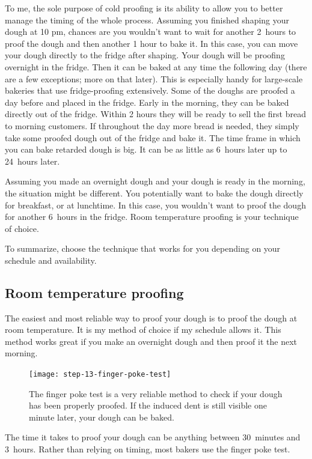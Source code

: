 To me, the sole purpose of cold proofing is its ability to allow you
to better manage the timing of the whole process. Assuming you finished shaping
your dough at 10 pm, chances are you wouldn't want to wait for another
2~hours to proof the dough and then another 1 hour to bake it. In this case,
you can move your dough directly to the fridge after shaping. Your
dough will be proofing overnight in the fridge. Then it can be baked at any time
the following day (there are a few exceptions; more on that later).
This is especially handy for large-scale bakeries that use fridge-proofing
extensively. Some of the doughs are proofed a day before and placed in the fridge.
Early in the morning, they can be baked directly out of the fridge. Within 2
hours they will be ready to sell the first bread to morning customers. If
throughout the day more bread is needed, they simply take some proofed dough out
of the fridge and bake it. The time frame in which you can bake retarded
dough is big. It can be as little as 6~hours later up to 24~hours later.

Assuming you made an overnight dough and your dough is ready in the morning,
the situation might be different. You potentially want to bake the dough directly
for breakfast, or at lunchtime. In this case, you wouldn't want to proof the dough for
another 6~hours in the fridge. Room temperature proofing is your technique
of choice.

To summarize, choose the technique that works for you depending on your
schedule and availability.

\subsection{Room temperature proofing}

The easiest and most reliable way to proof your dough is to proof the dough at
room temperature. It is my method of choice if my schedule allows it. This method
works great if you make an overnight dough and then proof it the next
morning.

\begin{figure}[htb!]
  \texttt{[image: step-13-finger-poke-test]}
  \caption[The finger poke test]{The finger poke test is a very reliable
      method to check if your dough has been properly proofed. If the induced
      dent is still visible one minute later, your dough can be baked.}%
  \label{fig:shaping-finger-poke}
\end{figure}

The time it takes to proof your dough can be anything between 30~minutes and
3~hours. Rather than relying on timing, most bakers use the finger poke test.

